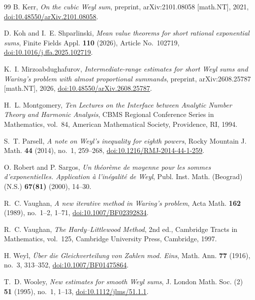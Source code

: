 \documentclass[11pt,reqno]{amsart}
\numberwithin{equation}{section}
\theoremstyle{definition}
\theoremstyle{remark}
\begin{document}
\begin{thebibliography}{99}
B. Kerr,
\emph{On the cubic Weyl sum},
preprint, arXiv:2101.08058 [math.NT], 2021,
\href{https://doi.org/10.48550/arXiv.2101.08058}{doi:10.48550/arXiv.2101.08058}.

D. Koh and I.~E. Shparlinski,
\emph{Mean value theorems for short rational exponential sums},
Finite Fields Appl. \textbf{110} (2026), Article No.~102719,
\href{https://doi.org/10.1016/j.ffa.2025.102719}{doi:10.1016/j.ffa.2025.102719}.

K.~I. Mirzoabdughafurov,
\emph{Intermediate-range estimates for short Weyl sums and Waring's problem
with almost proportional summands},
preprint, arXiv:2608.25787 [math.NT], 2026,
\href{https://doi.org/10.48550/arXiv.2608.25787}{doi:10.48550/arXiv.2608.25787}.

H.~L. Montgomery,
\emph{Ten Lectures on the Interface between Analytic Number Theory and Harmonic Analysis},
CBMS Regional Conference Series in Mathematics, vol.~84,
American Mathematical Society, Providence, RI, 1994.

S.~T. Parsell,
\emph{A note on Weyl's inequality for eighth powers},
Rocky Mountain J. Math. \textbf{44} (2014), no.~1, 259--268,
\href{https://doi.org/10.1216/RMJ-2014-44-1-259}{doi:10.1216/RMJ-2014-44-1-259}.

O. Robert and P. Sargos,
\emph{Un th\'eor\`eme de moyenne pour les sommes d'exponentielles.
Application \`a l'in\'egalit\'e de Weyl},
Publ. Inst. Math. (Beograd) (N.S.) \textbf{67(81)} (2000), 14--30.


R.~C. Vaughan,
\emph{A new iterative method in Waring's problem},
Acta Math. \textbf{162} (1989), no.~1--2, 1--71,
\href{https://doi.org/10.1007/BF02392834}{doi:10.1007/BF02392834}.

R.~C. Vaughan,
\emph{The Hardy--Littlewood Method}, 2nd ed.,
Cambridge Tracts in Mathematics, vol.~125,
Cambridge University Press, Cambridge, 1997.

H. Weyl,
\emph{\"Uber die Gleichverteilung von Zahlen mod. Eins},
Math. Ann. \textbf{77} (1916), no.~3, 313--352,
\href{https://doi.org/10.1007/BF01475864}{doi:10.1007/BF01475864}.

T.~D. Wooley,
\emph{New estimates for smooth Weyl sums},
J. London Math. Soc. (2) \textbf{51} (1995), no.~1, 1--13,
\href{https://doi.org/10.1112/jlms/51.1.1}{doi:10.1112/jlms/51.1.1}.


\end{thebibliography}
\end{document}
